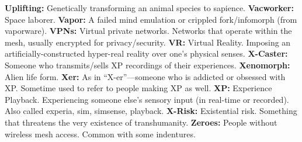 \textbf{ Uplifting:} Genetically transforming an animal species to 
sapience.
\textbf{ Vacworker:} Space laborer.
\textbf{ Vapor:} A failed mind emulation or crippled fork/infomorph
(from vaporware).
\textbf{ VPNs:} Virtual private networks. Networks that operate 
within the mesh, usually encrypted for privacy/security.
\textbf{ VR:} Virtual Reality. Imposing an artificially-constructed 
hyper-real reality over one's physical senses.
\textbf{ X-Caster:} Someone who transmits/sells XP recordings of 
their experiences.
\textbf{ Xenomorph:} Alien life form.
\textbf{ Xer:} As in ``X-er''—someone who is addicted or 
obsessed with XP. Sometime used to refer to people 
making XP as well.
\textbf{ XP:} Experience Playback. Experiencing someone else's 
sensory input (in real-time or recorded). Also called 
experia, sim, simsense, playback.
\textbf{ X-Risk:} Existential risk. Something that threatens the 
very existence of transhumanity.
\textbf{ Zeroes:} People without wireless mesh access. Common 
with some indentures.
